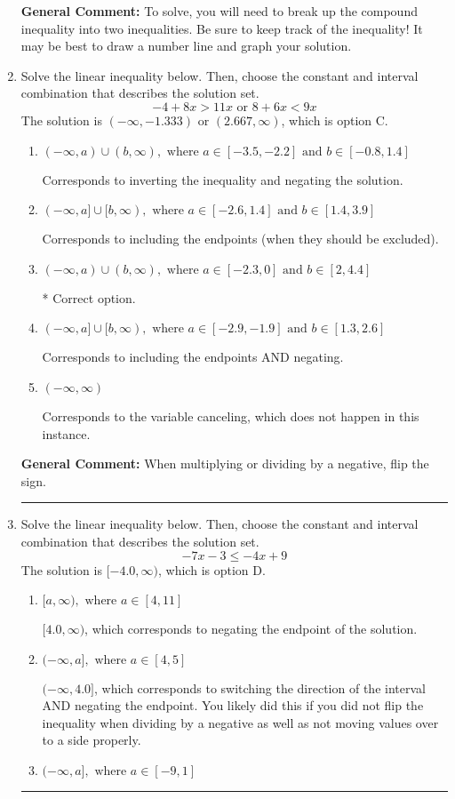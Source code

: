 \documentclass{extbook}[14pt]
\newcommand{\litem}[1]{\item #1

\rule{\textwidth}{0.4pt}}
\begin{document}
\begin{enumerate}
{\textbf{General Comment:} To solve, you will need to break up the compound inequality into two inequalities. Be sure to keep track of the inequality! It may be best to draw a number line and graph your solution.
}
\litem{
Solve the linear inequality below. Then, choose the constant and interval combination that describes the solution set.
\[ -4 + 8 x > 11 x \text{ or } 8 + 6 x < 9 x \]The solution is \( (-\infty, -1.333) \text{ or } (2.667, \infty) \), which is option C.\begin{enumerate}[label=\Alph*.]
\item \( (-\infty, a) \cup (b, \infty), \text{ where } a \in [-3.5, -2.2] \text{ and } b \in [-0.8, 1.4] \)

Corresponds to inverting the inequality and negating the solution.
\item \( (-\infty, a] \cup [b, \infty), \text{ where } a \in [-2.6, 1.4] \text{ and } b \in [1.4, 3.9] \)

Corresponds to including the endpoints (when they should be excluded).
\item \( (-\infty, a) \cup (b, \infty), \text{ where } a \in [-2.3, 0] \text{ and } b \in [2, 4.4] \)

 * Correct option.
\item \( (-\infty, a] \cup [b, \infty), \text{ where } a \in [-2.9, -1.9] \text{ and } b \in [1.3, 2.6] \)

Corresponds to including the endpoints AND negating.
\item \( (-\infty, \infty) \)

Corresponds to the variable canceling, which does not happen in this instance.
\end{enumerate}

\textbf{General Comment:} When multiplying or dividing by a negative, flip the sign.
}
\litem{
Solve the linear inequality below. Then, choose the constant and interval combination that describes the solution set.
\[ -7x -3 \leq -4x + 9 \]The solution is \( [-4.0, \infty) \), which is option D.\begin{enumerate}[label=\Alph*.]
\item \( [a, \infty), \text{ where } a \in [4, 11] \)

 $[4.0, \infty)$, which corresponds to negating the endpoint of the solution.
\item \( (-\infty, a], \text{ where } a \in [4, 5] \)

 $(-\infty, 4.0]$, which corresponds to switching the direction of the interval AND negating the endpoint. You likely did this if you did not flip the inequality when dividing by a negative as well as not moving values over to a side properly.
\item \( (-\infty, a], \text{ where } a \in [-9, 1] \)


\end{enumerate}}
\end{enumerate}
\end{document}
